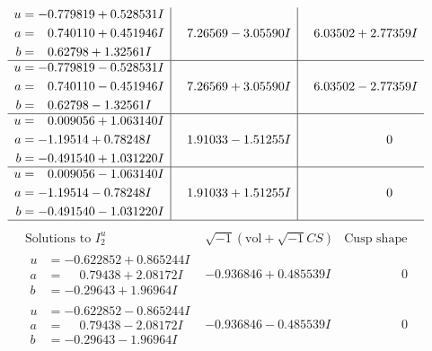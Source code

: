 \documentclass[1p]{elsarticle_modified}
\theoremstyle{definition}
\newcommand{\I}{\sqrt{-1}}
\begin{document}
$$\begin{array}{c|c|c}
\begin{aligned}
u &= -0.779819 + 0.528531 I \\
a &= \phantom{-}0.740110 + 0.451946 I \\
b &= \phantom{-}0.62798 + 1.32561 I\end{aligned}
 & \phantom{-}7.26569 - 3.05590 I & \phantom{-}6.03502 + 2.77359 I \\ \hline\begin{aligned}
u &= -0.779819 - 0.528531 I \\
a &= \phantom{-}0.740110 - 0.451946 I \\
b &= \phantom{-}0.62798 - 1.32561 I\end{aligned}
 & \phantom{-}7.26569 + 3.05590 I & \phantom{-}6.03502 - 2.77359 I \\ \hline\begin{aligned}
u &= \phantom{-}0.009056 + 1.063140 I \\
a &= -1.19514 + 0.78248 I \\
b &= -0.491540 + 1.031220 I\end{aligned}
 & \phantom{-}1.91033 - 1.51255 I & \phantom{-0.000000 } 0 \\ \hline\begin{aligned}
u &= \phantom{-}0.009056 - 1.063140 I \\
a &= -1.19514 - 0.78248 I \\
b &= -0.491540 - 1.031220 I\end{aligned}
 & \phantom{-}1.91033 + 1.51255 I & \phantom{-0.000000 } 0\\
 \hline 
 \end{array}$$\newpage$$\begin{array}{c|c|c}  
\text{Solutions to }I^u_{2}& \I (\text{vol} + \sqrt{-1}CS) & \text{Cusp shape}\\
 \hline 
\begin{aligned}
u &= -0.622852 + 0.865244 I \\
a &= \phantom{-}0.79438 + 2.08172 I \\
b &= -0.29643 + 1.96964 I\end{aligned}
 & -0.936846 + 0.485539 I & \phantom{-0.000000 } 0 \\ \hline\begin{aligned}
u &= -0.622852 - 0.865244 I \\
a &= \phantom{-}0.79438 - 2.08172 I \\
b &= -0.29643 - 1.96964 I\end{aligned}
 & -0.936846 - 0.485539 I & \phantom{-0.000000 } 0 \\ \hline\begin{aligned}

\end{aligned}
\end{array}$$
\end{document}
